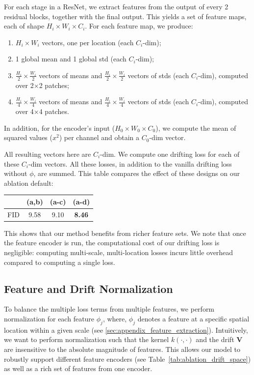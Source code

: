 \documentclass{article}
\newcommand{\tablestyle}[2]{\setlength{\tabcolsep}{#1}\renewcommand{\arraystretch}{#2}\centering
\small
}
\newcommand\tablefontsize{%
  \fontsize{8pt}{9pt}\selectfont
}
\newcommand{\vv}[1]{\mathbf{#1}}
\newcommand{\V}{\vv{V}}
\theoremstyle{plain}
\theoremstyle{definition}
\theoremstyle{remark}
\begin{document}
For each stage in a ResNet, we extract features from the output of every 2 residual blocks, together with the final output.
This yields a set of feature maps, each of shape $H_i{\times}W_i{\times}C_i$. For each feature map, we produce:
\begin{enumerate}[itemsep=2pt, topsep=2pt, parsep=4pt, partopsep=4pt,label=(\alph*)]
    \item $H_i{\times}W_i$ vectors, one per location (each $C_i$-dim);
    \item 1 global mean and 1 global std (each $C_i$-dim);
    \item $\frac{H_i}{2}{\times}\frac{W_i}{2}$ vectors of means and $\frac{H_i}{2}{\times}\frac{W_i}{2}$ vectors of stds (each $C_i$-dim), computed over 2${\times}$2 patches;
    \item $\frac{H_i}{4}{\times}\frac{W_i}{4}$ vectors of means and $\frac{H_i}{4}{\times}\frac{W_i}{4}$ vectors of stds (each $C_i$-dim), computed over 4${\times}$4 patches.
\end{enumerate}
In addition, for the encoder's input ($H_0{\times}W_0{\times}C_0$), we compute the mean of squared values ($x^2$) per channel and obtain a $C_0$-dim vector.

All resulting vectors here are $C_i$-dim.
We compute one drifting loss for each of these $C_i$-dim vectors. All these losses, in addition to the vanilla drifting loss without $\phi$, are summed.
This table compares the effect of these designs on our ablation default:
\begin{center}
\tablestyle{6pt}{1.02}
\tablefontsize
\begin{tabular}{c|ccc}
\toprule
 & (a,b) & (a-c) & (a-d) \\
\midrule
FID & 9.58 & 9.10 & \textbf{8.46} \\
\bottomrule
\end{tabular}
\end{center}
This shows that our method benefits from richer feature sets.
We note that once the feature encoder is run, the computational cost of our drifting loss is negligible: computing multi-scale, multi-location losses incurs little overhead compared to computing a single loss.


\subsection{Feature and Drift Normalization}
\label{sec:appendix_feature_and_loss_normalization}

To balance the multiple loss terms from multiple features, we perform normalization for each feature $\phi_j$, where, $\phi_j$ denotes a feature at a specific spatial location within a given scale (see \ref{sec:appendix_feature_extraction}).
Intuitively, we want to perform normalization such that the kernel $k(\cdot, \cdot)$ and the drift $\V$ are insensitive to the absolute magnitude of features.
This allows our model to robustly support different feature encoders (see Table~\ref{tab:ablation_drift_space}) as well as a rich set of features from one encoder.
\end{document}
